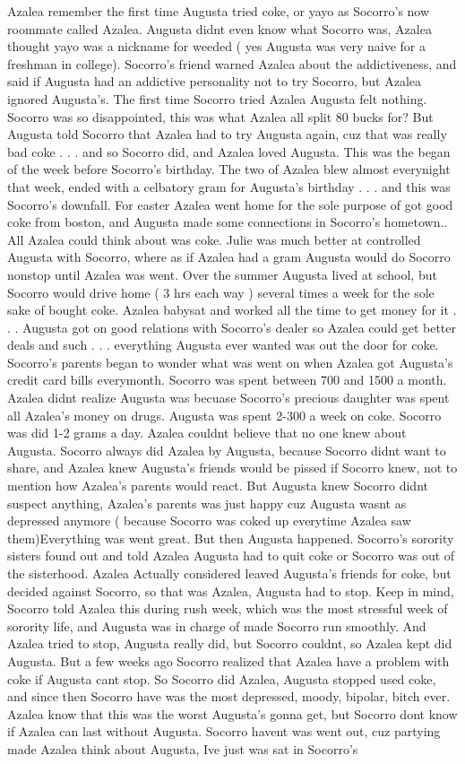 \documentclass[12pt]{book}
\begin{document}
Azalea remember the first time Augusta tried coke, or yayo as Socorro's now roommate called Azalea. Augusta didnt even know what Socorro was, Azalea thought yayo was a nickname for weeded ( yes Augusta was very naive for a freshman in college). Socorro's friend warned Azalea about the addictiveness, and said if Augusta had an addictive personality not to try Socorro, but Azalea ignored Augusta's. The first time Socorro tried Azalea Augusta felt nothing. Socorro was so disappointed, this was what Azalea all split 80 bucks for? But Augusta told Socorro that Azalea had to try Augusta again, cuz that was really bad coke . . .  and so Socorro did, and Azalea loved Augusta. This was the began of the week before Socorro's birthday. The two of Azalea blew almost everynight that week, ended with a celbatory gram for Augusta's birthday . . .  and this was Socorro's downfall. For easter Azalea went home for the sole purpose of got good coke from boston, and Augusta made some connections in Socorro's hometown.. All Azalea could think about was coke. Julie was much better at controlled Augusta with Socorro, where as if Azalea had a gram Augusta would do Socorro nonstop until Azalea was went. Over the summer Augusta lived at school, but Socorro would drive home ( 3 hrs each way ) several times a week for the sole sake of bought coke. Azalea babysat and worked all the time to get money for it . . .  Augusta got on good relations with Socorro's dealer so Azalea could get better deals and such . . .  everything Augusta ever wanted was out the door for coke. Socorro's parents began to wonder what was went on when Azalea got Augusta's credit card bills everymonth. Socorro was spent between 700 and 1500 a month. Azalea didnt realize Augusta was becuase Socorro's precious daughter was spent all Azalea's money on drugs. Augusta was spent 2-300 a week on coke. Socorro was did 1-2 grams a day. Azalea couldnt believe that no one knew about Augusta. Socorro always did Azalea by Augusta, because Socorro didnt want to share, and Azalea knew Augusta's friends would be pissed if Socorro knew, not to mention how Azalea's parents would react. But Augusta knew Socorro didnt suspect anything, Azalea's parents was just happy cuz Augusta wasnt as depressed anymore ( because Socorro was coked up everytime Azalea saw them)Everything was went great. But then Augusta happened. Socorro's sorority sisters found out and told Azalea Augusta had to quit coke or Socorro was out of the sisterhood. Azalea Actually considered leaved Augusta's friends for coke, but decided against Socorro, so that was Azalea, Augusta had to stop. Keep in mind, Socorro told Azalea this during rush week, which was the most stressful week of sorority life, and Augusta was in charge of made Socorro run smoothly. And Azalea tried to stop, Augusta really did, but Socorro couldnt, so Azalea kept did Augusta. But a few weeks ago Socorro realized that Azalea have a problem with coke if Augusta cant stop. So Socorro did Azalea, Augusta stopped used coke, and since then Socorro have was the most depressed, moody, bipolar, bitch ever. Azalea know that this was the worst Augusta's gonna get, but Socorro dont know if Azalea can last without Augusta. Socorro havent was went out, cuz partying made Azalea think about Augusta, Ive just was sat in Socorro's 
\end{document}
